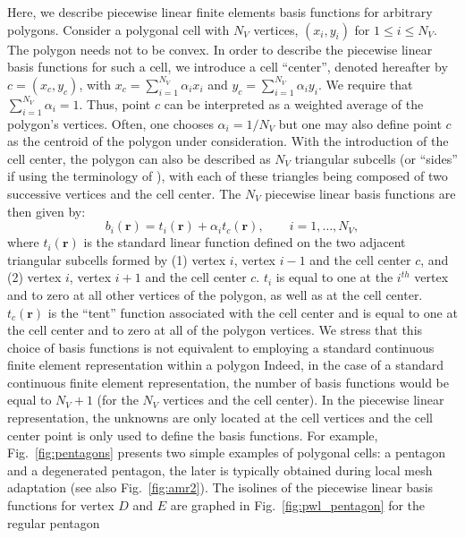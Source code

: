 \documentclass[preprint,10pt]{elsarticle}
\newcommand{\fig}[1]{Fig.~\ref{#1}}                      %
\newcommand\br{\mathbf{r}}
\begin{document}
Here, we describe piecewise linear finite elements basis functions for
arbitrary polygons.
Consider a polygonal cell with $N_V$ vertices, $(x_i,y_i)$ for $1\le i \le N_V$. 
The polygon needs not to be convex. In order to describe the piecewise linear basis functions
for such a cell, we introduce a cell ``center'', denoted hereafter 
by $c=(x_c,y_c)$, with $x_c =\sum_{i=1}^{N_V} \alpha_{i} x_i$
and  $y_c = \sum_{i=1}^{N_V} \alpha_{i} y_i$. We require that
$\sum_{i=1}^{N_V} \alpha_{i} = 1$. Thus, point $c$ can be interpreted as 
a weighted average of the polygon's vertices. Often, one chooses 
$\alpha_i = 1 / N_V$ but one may also define point $c$ as the centroid of the
polygon under consideration.
With the introduction of the cell center, the polygon can also be described as
$N_V$ triangular subcells (or ``sides'' if using the terminology of \cite{BaileyAdams2008}), 
with each of these triangles being composed of two
successive vertices and the cell center.
The $N_V$ piecewise linear basis functions are then given by:
%
\begin{equation}
  b_i(\br) = t_i(\br) + \alpha_{i} t_c(\br) , \qquad i=1,\ldots,N_V ,
\end{equation}
%
where $t_i(\br)$ is the standard linear function defined on the two adjacent
triangular subcells formed by (1) vertex $i$, vertex $i-1$ and the cell center $c$,
and (2) vertex $i$, vertex $i+1$ and the cell center $c$.
$t_i$ is equal to one at the $i^{th}$ vertex and to zero at all other vertices of the polygon,
as well as at the cell center.
$t_c(\br)$ is the ``tent'' function associated with the cell center and is equal to one 
at the cell center and to zero at all of the polygon vertices.
%
We stress that this choice of basis functions is not equivalent to employing a standard 
continuous finite element representation within a polygon 
Indeed, in the case of a standard continuous finite 
element representation, the number of basis functions would be equal to $N_V+1$ 
(for the $N_V$ vertices and the cell center). In the
piecewise linear representation, the unknowns are only located at the cell 
vertices and the cell center point is only used to define the basis functions.
For example, \fig{fig:pentagons} presents two simple examples of polygonal cells: a 
pentagon and a degenerated pentagon, the later is typically obtained
during local mesh adaptation (see also \fig{fig:amr2}).
The isolines of the piecewise linear basis functions for vertex $D$ and
$E$ are graphed in \fig{fig:pwl_pentagon} for the regular pentagon
\end{document}
